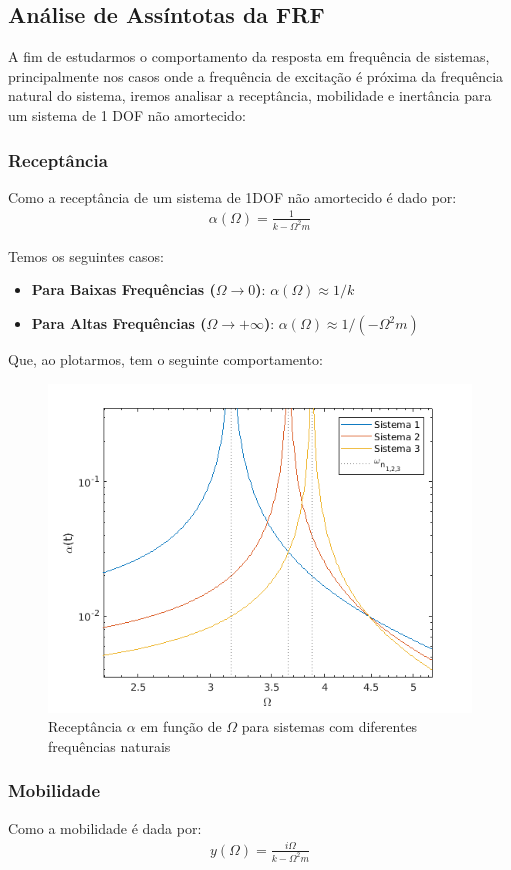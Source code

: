 \documentclass{article}
\begin{document}
\newpage
\subsection{Análise de Assíntotas da FRF}
A fim de estudarmos o comportamento da resposta em frequência de sistemas, principalmente nos casos onde a frequência de excitação é próxima da frequência natural do sistema, iremos analisar a receptância, mobilidade e inertância para um sistema de 1 DOF não amortecido:

\subsubsection*{Receptância}
Como a receptância de um sistema de 1DOF não amortecido é dado por:
\begin{align*}
    \alpha(\Omega) = \frac{1}{k - \Omega^2m}
\end{align*}

Temos os seguintes casos:
\begin{itemize}
    \item \textbf{Para Baixas Frequências ($\Omega \rightarrow 0$)}: $\alpha(\Omega) \approx 1/k$
    \item \textbf{Para Altas Frequências ($\Omega \rightarrow +\infty$)}: $\alpha(\Omega) \approx 1/(-\Omega^2 m)$
\end{itemize}

Que, ao plotarmos, tem o seguinte comportamento:

\begin{figure}[h]
    \centering
    \includegraphics[width=.5\textwidth]{imgs/receptancia.png}
    \caption{Receptância $\alpha$ em função de $\Omega$ para  sistemas com diferentes frequências naturais}
\end{figure}

\newpage
\subsubsection*{Mobilidade}
Como a mobilidade é dada por:
\begin{align*}
    y(\Omega) = \frac{i\Omega}{k - \Omega^2m}
\end{align*}
\end{document}
